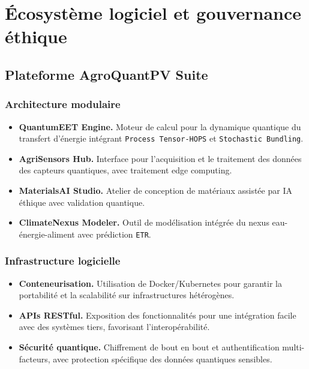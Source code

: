 \documentclass[12pt, a4paper]{article}
\begin{document}
\section{Écosystème logiciel et gouvernance éthique}

\subsection{Plateforme AgroQuantPV Suite}

\subsubsection{Architecture modulaire}

\begin{itemize}
    \item \textbf{QuantumEET Engine.} Moteur de calcul pour la dynamique quantique du transfert d'énergie intégrant \texttt{Process Tensor-HOPS} et \texttt{Stochastic Bundling}.
    
    \item \textbf{AgriSensors Hub.} Interface pour l'acquisition et le traitement des données des capteurs quantiques, avec traitement edge computing.
    
    \item \textbf{MaterialsAI Studio.} Atelier de conception de matériaux assistée par IA éthique avec validation quantique.
    
    \item \textbf{ClimateNexus Modeler.} Outil de modélisation intégrée du nexus eau-énergie-aliment avec prédiction \texttt{ETR}.
\end{itemize}

\subsubsection{Infrastructure logicielle}

\begin{itemize}
    \item \textbf{Conteneurisation.} Utilisation de Docker/Kubernetes pour garantir la portabilité et la scalabilité sur infrastructures hétérogènes.
    
    \item \textbf{APIs RESTful.} Exposition des fonctionnalités pour une intégration facile avec des systèmes tiers, favorisant l'interopérabilité.
    
    \item \textbf{Sécurité quantique.} Chiffrement de bout en bout et authentification multi-facteurs, avec protection spécifique des données quantiques sensibles.
\end{itemize}
\end{document}
